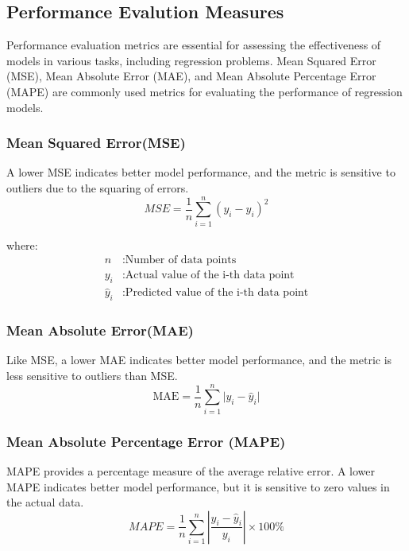 \documentclass[preprint,12pt]{elsarticle}
\begin{document}
\subsection{Performance Evalution Measures}
Performance evaluation metrics are essential for assessing the effectiveness of models in various tasks, including regression problems. Mean Squared Error (MSE), Mean Absolute Error (MAE), and Mean Absolute Percentage Error (MAPE) are commonly used metrics for evaluating the performance of regression models.

\subsubsection{Mean Squared Error(MSE)}
A lower MSE indicates better model performance, and the metric is sensitive to outliers due to the squaring of errors.
\begin{equation}
	MSE = \frac{1}{n} \sum_{i=1}^{n} (y_i - \hat{y}_i)^2
\end{equation}

where:
\begin{align*}
	n & : \text{Number of data points} \\
	y_i & : \text{Actual value of the i-th data point} \\
	\hat{y}_i & : \text{Predicted value of the i-th data point}
\end{align*}

\subsubsection{Mean Absolute Error(MAE)}
Like MSE, a lower MAE indicates better model performance, and the metric is less sensitive to outliers than MSE.
\begin{equation}
	\text{MAE} = \frac{1}{n} \sum_{i=1}^{n} \lvert y_i - \hat{y}_i \rvert
\end{equation}

\subsubsection{Mean Absolute Percentage Error (MAPE)}
MAPE provides a percentage measure of the average relative error. A lower MAPE indicates better model performance, but it is sensitive to zero values in the actual data.
\begin{equation}
	MAPE = \frac{1}{n} \sum_{i=1}^{n} \left| \frac{y_i - \hat{y}_i}{y_i} \right| \times 100\%
\end{equation}
\end{document}

